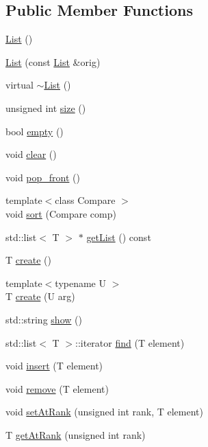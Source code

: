 \subsection*{Public Member Functions}
\begin{DoxyCompactItemize}
\item 
\hyperlink{class_list_a5c5e27671b21b3815d4e25b953c69454}{List} ()
\item 
\hyperlink{class_list_a46e402e625d805b8ccb565129d4d9680}{List} (const \hyperlink{class_list}{List} \&orig)
\item 
virtual \hyperlink{class_list_a2b58189090f6e5ce52939c9195e59e85}{$\sim$\+List} ()
\item 
unsigned int \hyperlink{class_list_ad908ab5cf19370fcdf61cf1927e5e8f5}{size} ()
\item 
bool \hyperlink{class_list_a3737ca60365287ce663393d8c07d1a41}{empty} ()
\item 
void \hyperlink{class_list_ae296516a252e11963dbf963727ce429a}{clear} ()
\item 
void \hyperlink{class_list_a024af4543f71544345351a45850c42d8}{pop\+\_\+front} ()
\item 
{\footnotesize template$<$class Compare $>$ }\\void \hyperlink{class_list_af5bf0ad4812b1a9da9eb20a4646e3e96}{sort} (Compare comp)
\item 
std\+::list$<$ T $>$ $\ast$ \hyperlink{class_list_a570498345450f635b72d1ca2675145cc}{get\+List} () const 
\item 
T \hyperlink{class_list_a3439065c3222c241427e9deb6adf1b01}{create} ()
\item 
{\footnotesize template$<$typename U $>$ }\\T \hyperlink{class_list_a767b6b53a19368f4623d72cea74f9c7b}{create} (U arg)
\item 
std\+::string \hyperlink{class_list_a8f30a708a550bcca33f64dc6fea8affa}{show} ()
\item 
std\+::list$<$ T $>$\+::iterator \hyperlink{class_list_a2f50d3342e016ec57876798ad4e8bf31}{find} (T element)
\item 
void \hyperlink{class_list_a518d00fd77740525522949d4316e8826}{insert} (T element)
\item 
void \hyperlink{class_list_a0ac08f7f3dad900b99e9a73e76d2beee}{remove} (T element)
\item 
void \hyperlink{class_list_af7370c56bb6396b7ed26ab20a81eff6d}{set\+At\+Rank} (unsigned int rank, T element)
\item 
T \hyperlink{class_list_a8cb47b18ef3c8e1496ed0e668c07c188}{get\+At\+Rank} (unsigned int rank)

\end{DoxyCompactItemize}
